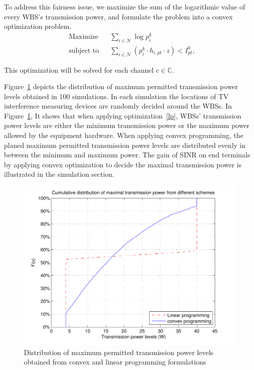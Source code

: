 \documentclass[times]{ettauth}
\theoremstyle{mytheoremstyle}
\theoremstyle{mytheoremstyle}
\theoremstyle{mytheoremstyle}
\begin{document}
To address this fairness issue, we maximize the sum of the logarithmic value of every WBS's transmission power, and formulate the problem into a convex optimization problem.
	\begin{equation}
		\label{cvx}
		\begin{aligned}
		& {\text{Maximize}}
		& & \sum_{i\in \mathcal{N}} \log p^k_i \\
		& \text{subject to}
		& & \sum_{i\in \mathcal{N}} (p^k_i \cdot h_{i,pt}\cdot z) < I^k_{pt}, 
		\end{aligned}
	\end{equation}

This optimization will be solved for each channel $c\in \mathbb{C}$.

Figure~\ref{lpcvx} depicts the distribution of maximum permitted transmission power levels obtained in 100 simulations.
In each simulation the locations of TV interference measuring devices are randomly decided around the WBSs.
In Figure~\ref{lpcvx}, It shows that when applying optimization~\ref{lp}, WBSs' transmission power levels are either the minimum transmission power or the maximum power allowed by the equipment hardware.
When applying convex programming, the planed maximum permitted transmission power levels are distributed evenly in between the minimum and maximum power.
The gain of SINR on end terminals by applying convex optimization to decide the maximal transmission power is illustrated in the simulation section.

\begin{figure}[h!]
  \centering
  \includegraphics[width=0.89\linewidth]{lpcvxcdf100runs.pdf}
  \caption{Distribution of maximum permitted transmission power levels obtained from convex and linear programming formulations}
\label{lpcvx}
\end{figure}
\end{document}
